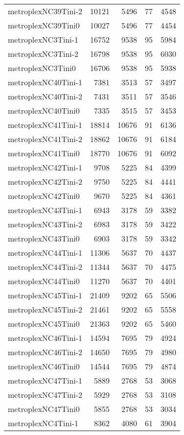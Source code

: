 \documentclass[../../../thesis.tex]{subfiles}
\begin{document}
\begin{longtable}{lrrrr}
metroplexNC39Tini-2 & 10121 & 5496 & 77 & 4548 \\
metroplexNC39Tini0 & 10027 & 5496 & 77 & 4454 \\
metroplexNC3Tini-1 & 16752 & 9538 & 95 & 5984 \\
metroplexNC3Tini-2 & 16798 & 9538 & 95 & 6030 \\
metroplexNC3Tini0 & 16706 & 9538 & 95 & 5938 \\
metroplexNC40Tini-1 & 7381 & 3513 & 57 & 3497 \\
metroplexNC40Tini-2 & 7431 & 3511 & 57 & 3546 \\
metroplexNC40Tini0 & 7335 & 3515 & 57 & 3453 \\
metroplexNC41Tini-1 & 18814 & 10676 & 91 & 6136 \\
metroplexNC41Tini-2 & 18862 & 10676 & 91 & 6184 \\
metroplexNC41Tini0 & 18770 & 10676 & 91 & 6092 \\
metroplexNC42Tini-1 & 9708 & 5225 & 84 & 4399 \\
metroplexNC42Tini-2 & 9750 & 5225 & 84 & 4441 \\
metroplexNC42Tini0 & 9670 & 5225 & 84 & 4361 \\
metroplexNC43Tini-1 & 6943 & 3178 & 59 & 3382 \\
metroplexNC43Tini-2 & 6983 & 3178 & 59 & 3422 \\
metroplexNC43Tini0 & 6903 & 3178 & 59 & 3342 \\
metroplexNC44Tini-1 & 11306 & 5637 & 70 & 4437 \\
metroplexNC44Tini-2 & 11344 & 5637 & 70 & 4475 \\
metroplexNC44Tini0 & 11270 & 5637 & 70 & 4401 \\
metroplexNC45Tini-1 & 21409 & 9202 & 65 & 5506 \\
metroplexNC45Tini-2 & 21461 & 9202 & 65 & 5558 \\
metroplexNC45Tini0 & 21363 & 9202 & 65 & 5460 \\
metroplexNC46Tini-1 & 14594 & 7695 & 79 & 4924 \\
metroplexNC46Tini-2 & 14650 & 7695 & 79 & 4980 \\
metroplexNC46Tini0 & 14544 & 7695 & 79 & 4874 \\
metroplexNC47Tini-1 & 5889 & 2768 & 53 & 3068 \\
metroplexNC47Tini-2 & 5929 & 2768 & 53 & 3108 \\
metroplexNC47Tini0 & 5855 & 2768 & 53 & 3034 \\
metroplexNC4Tini-1 & 8362 & 4080 & 61 & 3904 \\

\end{longtable}
\end{document}
